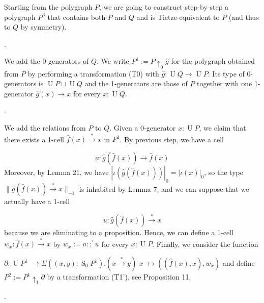 \documentclass[10pt,a4paper]{amsart}
\begin{document}
 
Starting from the polygraph $P$, we are going to construct step-by-step a polygraph $P^{3}$ that contains both $P$ and $Q$ and is Tietze-equivalent to $P$ (and thus to $Q$ by symmetry).\par
  
\par{}. 
 
We add the 0-generators of $Q$. We write $P^{1}:=P{\uparrow_{0}}\hat{g}$ for the polygraph obtained from $P$ by performing a transformation (T0) with $\hat{g}:\operatorname{U}Q\to\operatorname{U}P$. Its type of 0-generators is $\operatorname{U}P\sqcup\operatorname{U}Q$ and the 1-generators are those of $P$ together with one 1-generator $\hat{g}(x)\to x$ for every $x:\operatorname{U}Q$.\par
 
 
 
\par{}. 
 
We add the relations from $P$ to $Q$. Given a 0-generator $x:\operatorname{U}P$, we claim that there exists a 1-cell $\hat{f}(x)\overset{*}{\to}x$ in $P^{1}$. By previous step, we have a cell\par
    \[a:\hat{g}(\hat{f}(x))\to\hat{f}(x)\]    
Moreover, by Lemma 21, we have $|\iota(\hat{g}(\hat{f}(x)))|_{0}=|\iota(x)|_{0}$, so the type $\|\hat{g}(\hat{f}(x))\overset{*}{\to}x\|_{-1}$ is inhabited by Lemma 7, and we can suppose that we actually have a 1-cell\par
    \[u:\hat{g}(\hat{f}(x))\overset{*}{\to}x\]    
because we are eliminating to a proposition. Hence, we can define a 1-cell $w_{x}:\hat{f}(x)\overset{*}{\to}x$ by $w_{x}:=a::^{\prime}u$ for every $x:\operatorname{U}P$. Finally, we consider the function\par
    $\displaystyle\partial:\operatorname{U}P^{1}$ $\displaystyle\to\Sigma((x,y):\operatorname{S}_{0}P^{1}).(x\overset{*}{\to}y)$     $\displaystyle x$ $\displaystyle\mapsto((\hat{f}(x),x),w_{x})$    
and define $P^{2}:=P^{1}{\uparrow_{1}}\partial$ by a transformation (T1’), see Proposition 11.\par
 
 
 
\par{}. 
 
\end{document}
